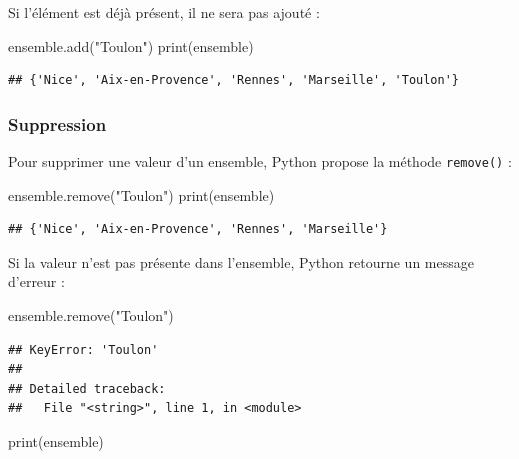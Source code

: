 \documentclass[12pt,]{book}
\newenvironment{Shaded}{\begin{snugshade}}{\end{snugshade}}
\newcommand{\StringTok}[1]{\textcolor[rgb]{0.31,0.60,0.02}{#1}}
\newcommand{\BuiltInTok}[1]{#1}
\newcommand{\NormalTok}[1]{#1}
\numberwithin{equation}{section}
\numberwithin{countremarque}{section}
\begin{document}
Si l'élément est déjà présent, il ne sera pas ajouté :

\begin{Shaded}
\begin{Highlighting}[]
\NormalTok{ensemble.add(}\StringTok{"Toulon"}\NormalTok{)}
\BuiltInTok{print}\NormalTok{(ensemble)}
\end{Highlighting}
\end{Shaded}

\begin{lstlisting}
## {'Nice', 'Aix-en-Provence', 'Rennes', 'Marseille', 'Toulon'}
\end{lstlisting}

\subsubsection{Suppression}\label{suppression}

Pour supprimer une valeur d'un ensemble, Python propose la méthode
\texttt{remove()} :

\begin{Shaded}
\begin{Highlighting}[]
\NormalTok{ensemble.remove(}\StringTok{"Toulon"}\NormalTok{)}
\BuiltInTok{print}\NormalTok{(ensemble)}
\end{Highlighting}
\end{Shaded}

\begin{lstlisting}
## {'Nice', 'Aix-en-Provence', 'Rennes', 'Marseille'}
\end{lstlisting}

Si la valeur n'est pas présente dans l'ensemble, Python retourne un
message d'erreur :

\begin{Shaded}
\begin{Highlighting}[]
\NormalTok{ensemble.remove(}\StringTok{"Toulon"}\NormalTok{)}
\end{Highlighting}
\end{Shaded}

\begin{lstlisting}
## KeyError: 'Toulon'
## 
## Detailed traceback: 
##   File "<string>", line 1, in <module>
\end{lstlisting}

\begin{Shaded}
\begin{Highlighting}[]
\BuiltInTok{print}\NormalTok{(ensemble)}
\end{Highlighting}
\end{Shaded}
\end{document}
